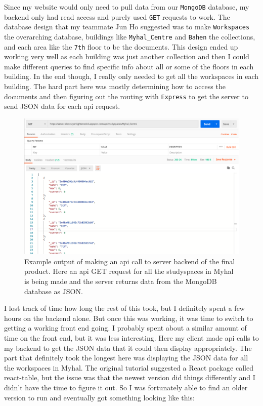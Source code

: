 \documentclass[a4paper,12pt]{gress}
\begin{document}
Since my website would only need to pull data from our \lstinline{MongoDB} database, my backend only had read access and purely used \lstinline{GET} requests to work. The database design that my teammate Jun Ho suggested was to make \lstinline{Workspaces} the overarching database, buildings like \lstinline{Myhal_Centre} and \lstinline{Bahen} the collections, and each area like the \lstinline{7th} floor to be the documents. This design ended up working very well as each building was just another collection and then I could make different queries to find specific info about all or some of the floors in each building. In the end though, I really only needed to get all the workspaces in each building. The hard part here was mostly determining how to access the documents and then figuring out the routing with \lstinline{Express} to get the server to send JSON data for each api request.

\begin{figure}[H]
  \begin{center}
  \includegraphics[width=150mm, scale=0.2]{pictures/server-api-call.png}
  \caption{Example output of making an api call to server backend of the final product. Here an api GET request for all the studyspaces in Myhal is being made and the server returns data from the MongoDB database as JSON.}
  \end{center}
\end{figure}

I lost track of time how long the rest of this took, but I definitely spent a few hours on the backend alone. But once this was working, it was time to switch to getting a working front end going. I probably spent about a similar amount of time on the front end, but it was less interesting. Here my client made api calls to my backend to get the JSON data that it could then display appropriately. The part that definitely took the longest here was displaying the JSON data for all the workspaces in Myhal. The original tutorial suggested a React package called react-table, but the issue was that the newest version did things differently and I didn't have the time to figure it out. So I was fortunately able to find an older version to run and eventually got something looking like this:
\end{document}

